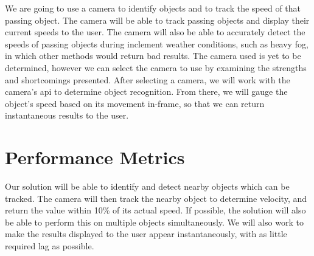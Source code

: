 \documentclass[letterpaper,10pt,onecolumn,draftclsnofoot]{IEEEtran}
\begin{document}
We are going to use a camera to identify objects and to track the speed of that passing object.
 The camera will be able to track passing objects and display their current speeds to the user.
 The camera will also be able to accurately detect the speeds of passing objects during inclement weather conditions, such as heavy fog, in which other methods would return bad results.
 The camera used is yet to be determined, however we can select the camera to use by examining the strengths and shortcomings presented.
 After selecting a camera, we will work with the camera’s api to determine object recognition.
 From there, we will gauge the object’s speed based on its movement in-frame, so that we can return instantaneous results to the user.
 

\section{Performance Metrics}

Our solution will be able to identify and detect nearby objects which can be tracked.
 The camera will then track the nearby object to determine velocity, and return the value within 10\% of its actual speed.
 If possible, the solution will also be able to perform this on multiple objects simultaneously.
 We will also work to make the results displayed to the user appear instantaneously, with as little required lag as possible.

 
\end{document}
